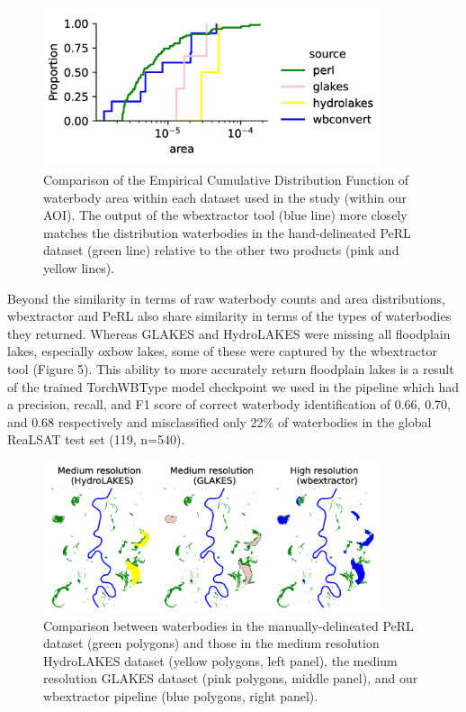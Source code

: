 \documentclass{article}
\begin{document}
\begin{figure}
	\centering
	\includegraphics[width=10cm]{../figures/accuracy}
	\caption{Comparison of the Empirical Cumulative Distribution Function of waterbody area within each dataset used in the study (within our AOI). The output of the wbextractor tool (blue line) more closely matches the distribution waterbodies in the hand-delineated PeRL dataset (green line) relative to the other two products (pink and yellow lines).}
	\label{fig:accuracy}
\end{figure}

Beyond the similarity in terms of raw waterbody counts and area distributions, wbextractor and PeRL also share similarity in terms of the types of waterbodies they returned. Whereas GLAKES and HydroLAKES were missing all floodplain lakes, especially oxbow lakes, some of these were captured by the wbextractor tool (Figure 5). This ability to more accurately return floodplain lakes is a result of the trained TorchWBType model checkpoint we used in the pipeline which had a precision, recall, and F1 score of correct waterbody identification of 0.66, 0.70, and 0.68 respectively and misclassified only 22\% of waterbodies in the global ReaLSAT test set (119, n=540).

\begin{figure}
	\centering
	\includegraphics[width=10cm]{../figures/floodplain}
	\caption{Comparison between waterbodies in the manually-delineated PeRL dataset (green polygons) and those in the medium resolution HydroLAKES dataset (yellow polygons, left panel), the medium resolution GLAKES dataset (pink polygons, middle panel), and our wbextractor pipeline (blue polygons, right panel).}
	\label{fig:floodplain}
\end{figure}
\end{document}
